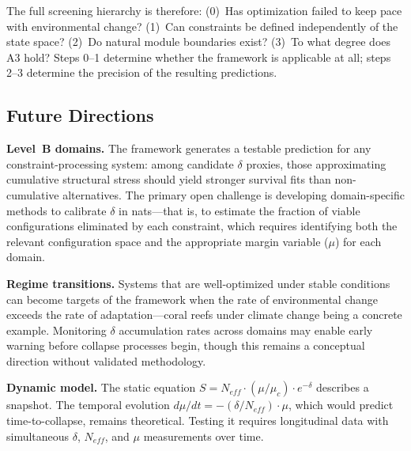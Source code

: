 \documentclass[11pt,a4paper]{article}
\begin{document}
The full screening hierarchy is therefore: (0)~Has optimization failed to keep pace with environmental change? (1)~Can constraints be defined independently of the state space? (2)~Do natural module boundaries exist? (3)~To what degree does A3 hold? Steps 0--1 determine whether the framework is applicable at all; steps 2--3 determine the precision of the resulting predictions.

\subsection{Future Directions}

\textbf{Level~B domains.} The framework generates a testable prediction for any constraint-processing system: among candidate $\delta$ proxies, those approximating cumulative structural stress should yield stronger survival fits than non-cumulative alternatives. The primary open challenge is developing domain-specific methods to calibrate $\delta$ in nats---that is, to estimate the fraction of viable configurations eliminated by each constraint, which requires identifying both the relevant configuration space and the appropriate margin variable ($\mu$) for each domain.

\textbf{Regime transitions.} Systems that are well-optimized under stable conditions can become targets of the framework when the rate of environmental change exceeds the rate of adaptation---coral reefs under climate change being a concrete example. Monitoring $\delta$ accumulation rates across domains may enable early warning before collapse processes begin, though this remains a conceptual direction without validated methodology.

\textbf{Dynamic model.} The static equation $S = N_{eff} \cdot (\mu/\mu_c) \cdot e^{-\delta}$ describes a snapshot. The temporal evolution $d\mu/dt = -(\delta/N_{eff}) \cdot \mu$, which would predict time-to-collapse, remains theoretical. Testing it requires longitudinal data with simultaneous $\delta$, $N_{eff}$, and $\mu$ measurements over time.
\end{document}
